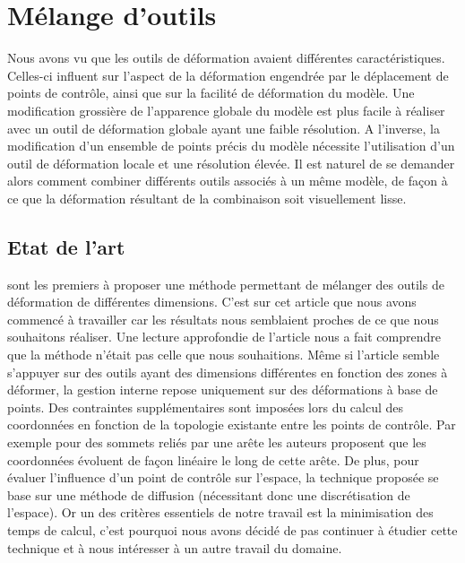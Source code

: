 

\chapter{Mélange d'outils}

\graphicspath{ {Chapter3/Chapter3Figs/PNG/}
  {Chapter3/Chapter3Figs/PDF/} {Chapter3/Chapter3Figs/} }

Nous avons vu que les outils de déformation avaient différentes
caractéristiques. Celles-ci influent sur l'aspect de la déformation engendrée
par le déplacement de points de contrôle, ainsi que sur la facilité de
déformation du modèle. Une modification grossière de l'apparence globale du
modèle est plus facile à réaliser avec un outil de déformation globale ayant
une faible résolution. A l'inverse, la modification d'un ensemble de points
précis du modèle nécessite l'utilisation d'un outil de déformation locale et
une résolution élevée. Il est naturel de se demander alors comment combiner
différents outils associés à un même modèle, de façon à ce que la déformation
résultant de la combinaison soit visuellement lisse.

\section{Etat de l'art}

\cite{JBPS11} sont les premiers à proposer une méthode permettant de mélanger
des outils de déformation de différentes dimensions. C'est sur cet article que
nous avons commencé à travailler car les résultats nous semblaient proches de
ce que nous souhaitons réaliser. Une lecture approfondie de l'article nous a
fait comprendre que la méthode n'était pas celle que nous souhaitions. Même si
l'article semble s'appuyer sur des outils ayant des dimensions différentes en
fonction des zones à déformer, la gestion interne repose uniquement sur des
déformations à base de points. Des contraintes supplémentaires sont imposées
lors du calcul des coordonnées en fonction de la topologie existante entre les
points de contrôle. Par exemple pour des sommets reliés par une arête les
auteurs proposent que les coordonnées évoluent de façon linéaire le long de
cette arête. De plus, pour évaluer l'influence d'un point de contrôle sur
l'espace, la technique proposée se base sur une méthode de diffusion
(nécessitant donc une discrétisation de l'espace). Or un des critères
essentiels de notre travail est la minimisation des temps de calcul, c'est
pourquoi nous avons décidé de pas continuer à étudier cette technique et à
nous intéresser à un autre travail du domaine.

